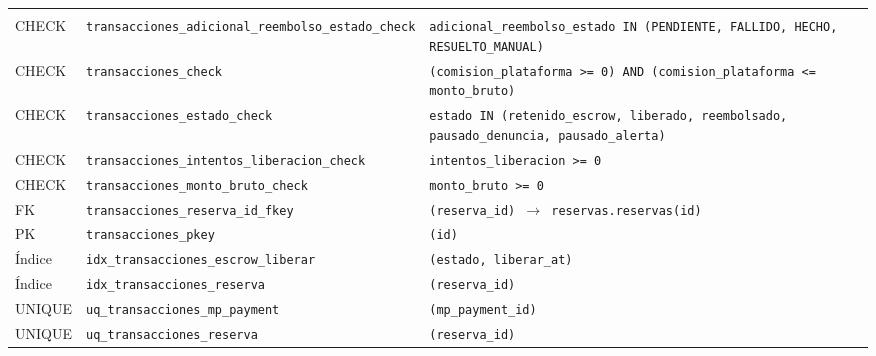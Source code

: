 {\small
\begin{xltabular}{\textwidth}{@{}>{\raggedright\arraybackslash}p{1.7cm} >{\raggedright\arraybackslash}p{4.6cm} L@{}}
    \toprule
     &  &  \\
    \midrule
    \endfirsthead
    \toprule
     &  &  \\
    \midrule
    \endhead
    \bottomrule
    \endfoot
    CHECK & \texttt{transacciones\_\allowbreak{}adicional\_\allowbreak{}reembolso\_\allowbreak{}estado\_\allowbreak{}check} & \texttt{adicional\_\allowbreak{}reembolso\_\allowbreak{}estado IN (\allowbreak{}\textquotesingle{}PENDIENTE\textquotesingle{},\allowbreak{} \textquotesingle{}FALLIDO\textquotesingle{},\allowbreak{} \textquotesingle{}HECHO\textquotesingle{},\allowbreak{} \textquotesingle{}RESUELTO\_\allowbreak{}MANUAL\textquotesingle{})} \\
    CHECK & \texttt{transacciones\_\allowbreak{}check} & \texttt{(\allowbreak{}comision\_\allowbreak{}plataforma \textgreater{}= 0) AND (\allowbreak{}comision\_\allowbreak{}plataforma \textless{}= monto\_\allowbreak{}bruto)} \\
    CHECK & \texttt{transacciones\_\allowbreak{}estado\_\allowbreak{}check} & \texttt{estado IN (\allowbreak{}\textquotesingle{}retenido\_\allowbreak{}escrow\textquotesingle{},\allowbreak{} \textquotesingle{}liberado\textquotesingle{},\allowbreak{} \textquotesingle{}reembolsado\textquotesingle{},\allowbreak{} \textquotesingle{}pausado\_\allowbreak{}denuncia\textquotesingle{},\allowbreak{} \textquotesingle{}pausado\_\allowbreak{}alerta\textquotesingle{})} \\
    CHECK & \texttt{transacciones\_\allowbreak{}intentos\_\allowbreak{}liberacion\_\allowbreak{}check} & \texttt{intentos\_\allowbreak{}liberacion \textgreater{}= 0} \\
    CHECK & \texttt{transacciones\_\allowbreak{}monto\_\allowbreak{}bruto\_\allowbreak{}check} & \texttt{monto\_\allowbreak{}bruto \textgreater{}= 0} \\
    FK & \texttt{transacciones\_\allowbreak{}reserva\_\allowbreak{}id\_\allowbreak{}fkey} & \texttt{(\allowbreak{}reserva\_\allowbreak{}id) $\rightarrow$ reservas.reservas(\allowbreak{}id)} \\
    PK & \texttt{transacciones\_\allowbreak{}pkey} & \texttt{(\allowbreak{}id)} \\
    Índice & \texttt{idx\_\allowbreak{}transacciones\_\allowbreak{}escrow\_\allowbreak{}liberar} & \texttt{(\allowbreak{}estado,\allowbreak{} liberar\_\allowbreak{}at)} \\
    Índice & \texttt{idx\_\allowbreak{}transacciones\_\allowbreak{}reserva} & \texttt{(\allowbreak{}reserva\_\allowbreak{}id)} \\
    UNIQUE & \texttt{uq\_\allowbreak{}transacciones\_\allowbreak{}mp\_\allowbreak{}payment} & \texttt{(\allowbreak{}mp\_\allowbreak{}payment\_\allowbreak{}id)} \\
    UNIQUE & \texttt{uq\_\allowbreak{}transacciones\_\allowbreak{}reserva} & \texttt{(\allowbreak{}reserva\_\allowbreak{}id)} \\
\end{xltabular}
}

